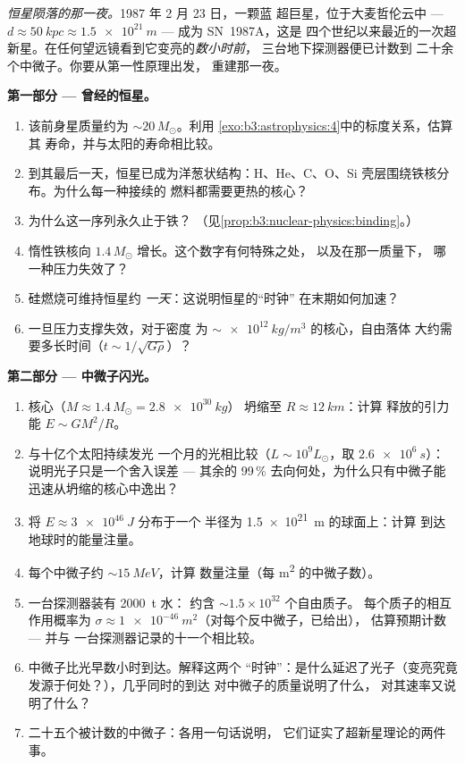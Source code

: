 \begin{problem}\label{pb:b3:astrophysics:1}
\emph{恒星陨落的那一夜。}1987 年 2 月 23 日，一颗蓝
超巨星，位于大麦哲伦云中 --- $d \approx
\qty{50}{kpc} \approx \qty{1.5e21}{m}$ --- 成为 SN~1987A，这是
四个世纪以来最近的一次超新星。在任何望远镜看到它变亮的\emph{数小时前}，
三台地下探测器便已计数到
二十余个中微子。你要从第一性原理出发，
重建那一夜。

\medskip\noindent\textbf{第一部分 --- 曾经的恒星。}

\begin{enumerate}
  \item 该前身星质量约为 ${\sim}20\,M_\odot$。利用
        \cref{exo:b3:astrophysics:4}中的标度关系，估算其
        寿命，并与太阳的寿命相比较。
  \item 到其最后一天，恒星已成为洋葱状结构：H、He、C、O、Si
        壳层围绕铁核分布。为什么每一种接续的
        燃料都需要更热的核心？
  \item 为什么这一序列永久止于铁？
        （见\cref{prop:b3:nuclear-physics:binding}。）
  \item 惰性铁核向 $1.4\,M_\odot$ 增长。这个数字有何特殊之处，
        以及在那一质量下，
        哪一种压力失效了？
  \item 硅燃烧可维持恒星约
        \emph{一天}：这说明恒星的“时钟”
        在末期如何加速？
  \item 一旦压力支撑失效，对于密度
        为 $\sim\qty{e12}{kg/m^3}$ 的核心，自由落体
        大约需要多长时间（$t \sim 1/\sqrt{G\rho}$）？
\end{enumerate}

\medskip\noindent\textbf{第二部分 --- 中微子闪光。}

\begin{enumerate}[resume]
  \item 核心（$M \approx 1.4\,M_\odot = \qty{2.8e30}{kg}$）
        坍缩至 $R \approx \qty{12}{km}$：计算
        释放的引力能 $E \sim GM^2/R$。
  \item 与十亿个太阳持续发光
        一个月的光相比较（$L \sim 10^{9}L_\odot$，取 $\qty{2.6e6}{s}$）：
        说明光子只是一个舍入误差 --- 其余的
        99\,\% 去向何处，为什么只有中微子能
        迅速从坍缩的核心中逸出？
  \item 将 $E \approx \qty{3e46}{J}$ 分布于一个
        半径为 \qty{1.5e21}{m} 的球面上：计算
        到达地球时的能量注量。
  \item 每个中微子约 $\sim\qty{15}{MeV}$，计算
        数量注量（每 \unit{m^2} 的中微子数）。
  \item 一台探测器装有 \qty{2000}{t} 水：
        约含 ${\sim}1.5\times10^{32}$ 个自由质子。
        每个质子的相互作用概率为
        $\sigma \approx \qty{1e-46}{m^2}$（对每个反中微子，已给出），
        估算预期计数 --- 并与
        一台探测器记录的十一个相比较。
  \item 中微子比光早数小时到达。解释这两个
        “时钟”：是什么延迟了光子（变亮究竟
        发源于何处？），几乎同时的到达
        对中微子的质量说明了什么，
        对其速率又说明了什么？
  \item 二十五个被计数的中微子：各用一句话说明，
        它们证实了超新星理论的两件事。
\end{enumerate}


\end{problem}
